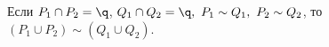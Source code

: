 
            Если $P_1\cap P_2=\q$, $Q_1\cap Q_2=\q,\ P_1\sim Q_1,\ P_2\sim Q_2$, то $(P_1\cup P_2)\sim (Q_1\cup Q_2)$.
        